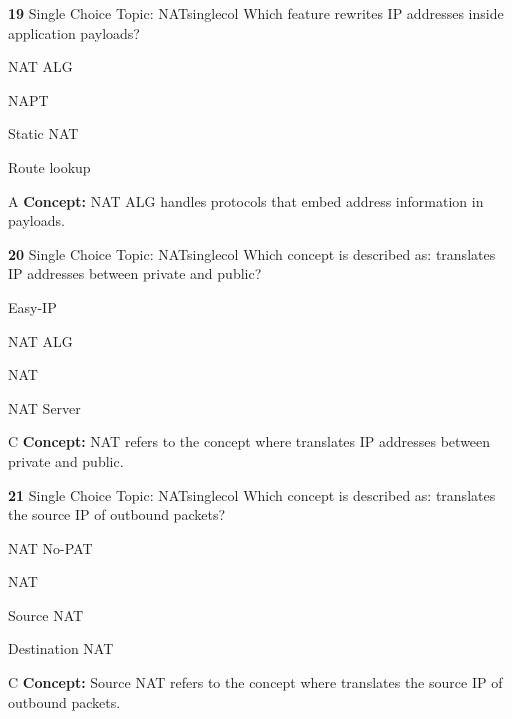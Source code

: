 \documentclass[10pt,a4paper]{article}
\begin{document}
\begin{qcard}{\color{white}\textbf{19} \hfill \small Single Choice \textbar{} Topic: NAT}{singlecol}
Which feature rewrites IP addresses inside application payloads?

\begin{qoptions}
\item NAT ALG
\item NAPT
\item Static NAT
\item Route lookup
\end{qoptions}
\begin{explainbox}{A}
\textbf{Concept:} NAT ALG handles protocols that embed address information in payloads.
\end{explainbox}
\end{qcard}

\begin{qcard}{\color{white}\textbf{20} \hfill \small Single Choice \textbar{} Topic: NAT}{singlecol}
Which concept is described as: translates IP addresses between private and public?

\begin{qoptions}
\item Easy-IP
\item NAT ALG
\item NAT
\item NAT Server
\end{qoptions}
\begin{explainbox}{C}
\textbf{Concept:} NAT refers to the concept where translates IP addresses between private and public.
\end{explainbox}
\end{qcard}

\begin{qcard}{\color{white}\textbf{21} \hfill \small Single Choice \textbar{} Topic: NAT}{singlecol}
Which concept is described as: translates the source IP of outbound packets?

\begin{qoptions}
\item NAT No-PAT
\item NAT
\item Source NAT
\item Destination NAT
\end{qoptions}
\begin{explainbox}{C}
\textbf{Concept:} Source NAT refers to the concept where translates the source IP of outbound packets.
\end{explainbox}
\end{qcard}
\end{document}
